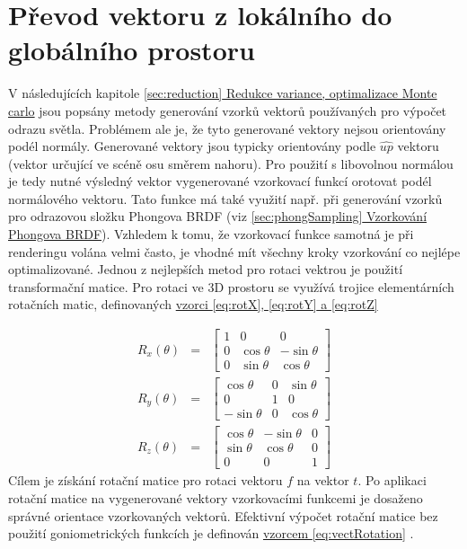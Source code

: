 \documentclass[czech,master]{diploma}
\newcommand{\uvec}[1]{\hat{#1}}
\newcommand{\fromVect}{f}
\newcommand{\toVect}{t}
\begin{document}
\section{Převod vektoru z lokálního do globálního prostoru}
V následujících kapitole \hyperref[sec:reduction]{\ref{sec:reduction} Redukce variance, optimalizace Monte carlo} jsou popsány metody generování vzorků vektorů používaných pro výpočet odrazu světla. Problémem ale je, že tyto generované vektory nejsou orientovány podél normály. Generované vektory jsou typicky orientovány podle $\uvec{up}$ vektoru (vektor určující ve scéně osu směrem nahoru). Pro použití s libovolnou normálou je tedy nutné výsledný vektor vygenerované vzorkovací funkcí orotovat podél normálového vektoru. Tato funkce má také využití např. při generování vzorků pro odrazovou složku Phongova BRDF (viz \hyperref[sec:phongSampling]{\ref{sec:phongSampling} Vzorkování Phongova BRDF}). Vzhledem k tomu, že vzorkovací funkce samotná je při renderingu volána velmi často, je vhodné mít všechny kroky vzorkování co nejlépe optimalizované. Jednou z nejlepších metod pro rotaci vektrou je použití transformační matice. Pro rotaci ve 3D prostoru se využívá trojice elementárních rotačních matic, definovaných \hyperref[eq:rotX]{vzorci \ref{eq:rotX}, \ref{eq:rotY} a \ref{eq:rotZ}} \cite{HughesDamEtAl13}\par
\begin{eqnarray}
  R_x(\theta) & = & \begin{bmatrix}
    1 & 0          & 0           \\
    0 & \cos\theta & -\sin\theta \\
    0 & \sin\theta & \cos\theta
  \end{bmatrix} \label{eq:rotX} \\
  R_y(\theta) & = & \begin{bmatrix}
    \cos\theta  & 0 & \sin\theta \\
    0           & 1 & 0          \\
    -\sin\theta & 0 & \cos\theta
  \end{bmatrix} \label{eq:rotY} \\
  R_z(\theta) & = & \begin{bmatrix}
    \cos\theta & -\sin\theta & 0 \\
    \sin\theta & \cos\theta  & 0 \\
    0          & 0           & 1
  \end{bmatrix}\label{eq:rotZ}
\end{eqnarray}
Cílem je získání rotační matice pro rotaci vektoru $\fromVect$ na vektor $\toVect$. Po aplikaci rotační matice na vygenerované vektory vzorkovacími funkcemi je dosaženo správné orientace vzorkovaných vektorů.  Efektivní výpočet rotační matice bez použití goniometrických funkcích je definován \hyperref[eq:vectRotation]{vzorcem \ref{eq:vectRotation}} \cite{MollerHughesVectRotation}.
\end{document}

